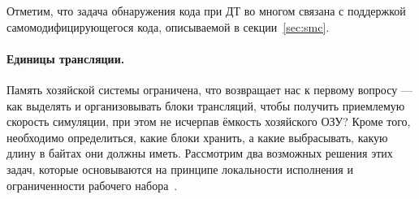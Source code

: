 Отметим, что задача обнаружения кода при ДТ во многом связана с поддержкой самомодифицирующегося кода, описываемой в секции~\ref{sec:smc}.

\paragraph{Единицы трансляции.} Память хозяйской системы ограничена, что возвращает нас к первому вопросу --- как выделять и организовывать блоки трансляций, чтобы  получить приемлемую скорость симуляции, при этом не исчерпав ёмкость хозяйского ОЗУ? Кроме того, необходимо определиться, какие блоки хранить, а какие выбрасывать, какую длину в байтах они должны иметь. Рассмотрим два возможных решения этих задач, которые основываются на принципе локальности исполнения и ограниченности рабочего набора~\cite{DBLP:books/daglib/0013597}.
 
